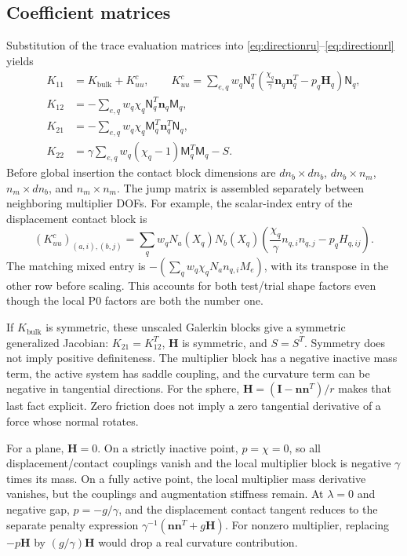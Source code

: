 \documentclass[preprint,11pt]{elsarticle}
\numberwithin{equation}{section}
\newcommand{\bn}{\boldsymbol{n}}
\newcommand{\bH}{\boldsymbol{H}}
\newcommand{\bI}{\boldsymbol{I}}
\begin{document}
\subsection{Coefficient matrices}
Substitution of the trace evaluation matrices into
\eqref{eq:directionru}--\eqref{eq:directionrl} yields
\begin{align}
 K_{11}&=K_{\mathrm{bulk}}+K_{uu}^{c},\qquad
 K_{uu}^{c}=\sum_{e,q}w_q\mathsf N_q^T
       \left(\frac{\chi_q}{\gamma}\bn_q\bn_q^T-p_q\bH_q\right)
       \mathsf N_q,\label{eq:k11}\\
 K_{12}&=-\sum_{e,q}w_q\chi_q\mathsf N_q^T\bn_q\mathsf M_q,
 \label{eq:k12}\\
 K_{21}&=-\sum_{e,q}w_q\chi_q\mathsf M_q^T\bn_q^T\mathsf N_q,
 \label{eq:k21}\\
 K_{22}&=\gamma\sum_{e,q}w_q(\chi_q-1)\mathsf M_q^T\mathsf M_q-S.
 \label{eq:k22}
\end{align}
Before global insertion the contact block dimensions are
$dn_b\times dn_b$, $dn_b\times n_m$, $n_m\times dn_b$, and
$n_m\times n_m$. The jump matrix is assembled separately between
neighboring multiplier DOFs. For example, the scalar-index entry of the
displacement contact block is
\begin{equation}
 (K_{uu}^c)_{(a,i),(b,j)}
 =\sum_q w_q N_a(X_q)N_b(X_q)
       \left(\frac{\chi_q}{\gamma}n_{q,i}n_{q,j}
                        -p_qH_{q,ij}\right).
 \label{eq:indexentry}
\end{equation}
The matching mixed entry is
$-(\sum_qw_q\chi_qN_a n_{q,i}M_e)$, with its transpose in the
other row before scaling. This accounts for both test/trial shape factors
even though the local P0 factors are both the number one.

If $K_{\mathrm{bulk}}$ is symmetric, these unscaled Galerkin blocks give
a symmetric generalized Jacobian: $K_{21}=K_{12}^T$, $\bH$ is symmetric,
and $S=S^T$. Symmetry does not imply positive definiteness. The multiplier
block has a negative inactive mass term, the active system has saddle
coupling, and the curvature term can be negative in tangential directions.
For the sphere, $\bH=(\bI-\bn\bn^T)/r$ makes that last fact explicit.
Zero friction does not imply a zero tangential derivative of a force whose
normal rotates.

For a plane, $\bH=0$. On a strictly inactive point, $p=\chi=0$, so
all displacement/contact couplings vanish and the local multiplier block
is negative $\gamma$ times its mass. On a fully active point, the
local multiplier mass derivative vanishes, but the couplings and
augmentation stiffness remain. At $\lambda=0$ and negative gap,
$p=-g/\gamma$, and the displacement contact tangent reduces to the
separate penalty expression
$\gamma^{-1}(\bn\bn^T+g\bH)$. For nonzero multiplier, replacing
$-p\bH$ by $(g/\gamma)\bH$ would drop a real curvature contribution.
\end{document}
